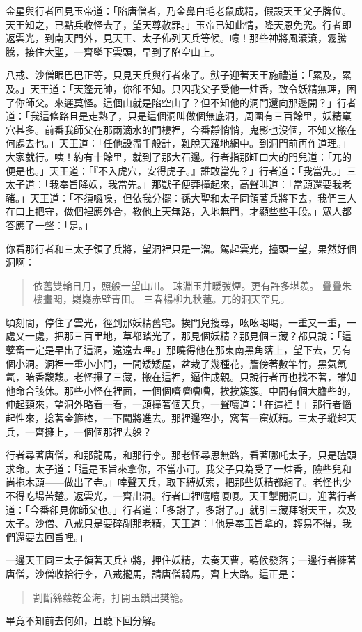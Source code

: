金星與行者回見玉帝道：「陷唐僧者，乃金鼻白毛老鼠成精，假設天王父子牌位。天王知之，已點兵收怪去了，望天尊赦罪。」玉帝已知此情，降天恩免究。行者即返雲光，到南天門外，見天王、太子佈列天兵等候。噫！那些神將風滾滾，霧騰騰，接住大聖，一齊墜下雲頭，早到了陷空山上。

八戒、沙僧眼巴巴正等，只見天兵與行者來了。獃子迎著天王施禮道：「累及，累及。」天王道：「天蓬元帥，你卻不知。只因我父子受他一炷香，致令妖精無理，困了你師父。來遲莫怪。這個山就是陷空山了？但不知他的洞門還向那邊開？」行者道：「我這條路且是走熟了，只是這個洞叫做個無底洞，周圍有三百餘里，妖精窠穴甚多。前番我師父在那兩滴水的門樓裡，今番靜悄悄，鬼影也沒個，不知又搬在何處去也。」天王道：「任他設盡千般計，難脫天羅地網中。到洞門前再作道理。」大家就行。咦！約有十餘里，就到了那大石邊。行者指那缸口大的門兒道：「兀的便是也。」天王道：「『不入虎穴，安得虎子。』誰敢當先？」行者道：「我當先。」三太子道：「我奉旨降妖，我當先。」那獃子便莽撞起來，高聲叫道：「當頭還要我老豬。」天王道：「不須囉噪，但依我分擺：孫大聖和太子同領著兵將下去，我們三人在口上把守，做個裡應外合，教他上天無路，入地無門，才顯些些手段。」眾人都答應了一聲：「是。」

你看那行者和三太子領了兵將，望洞裡只是一溜。駕起雲光，擡頭一望，果然好個洞啊：
\begin{quote}
依舊雙輪日月，照般一望山川。
珠淵玉井暖弢煙。更有許多堪羨。
疊疊朱樓畫閣，嶷嶷赤壁青田。
三春楊柳九秋蓮。兀的洞天罕見。
\end{quote}

頃刻間，停住了雲光，徑到那妖精舊宅。挨門兒搜尋，吆吆喝喝，一重又一重，一處又一處，把那三百里地，草都踏光了，那見個妖精？那見個三藏？都只說：「這孽畜一定是早出了這洞，遠遠去哩。」那曉得他在那東南黑角落上，望下去，另有個小洞。洞裡一重小小門，一間矮矮屋，盆栽了幾種花，簷傍著數竿竹，黑氣氳氳，暗香馥馥。老怪攝了三藏，搬在這裡，逼住成親。只說行者再也找不著，誰知他命合該休。那些小怪在裡面，一個個嚌嚌嘈嘈，挨挨簇簇。中間有個大膽些的，伸起頸來，望洞外略看一看，一頭撞著個天兵，一聲嚷道：「在這裡！」那行者惱起性來，捻著金箍棒，一下闖將進去。那裡邊窄小，窩著一窟妖精。三太子縱起天兵，一齊擁上，一個個那裡去躲？

行者尋著唐僧，和那龍馬，和那行李。那老怪尋思無路，看著哪吒太子，只是磕頭求命。太子道：「這是玉旨來拿你，不當小可。我父子只為受了一炷香，險些兒和尚拖木頭——做出了寺。」啈聲天兵，取下縛妖索，把那些妖精都綑了。老怪也少不得吃場苦楚。返雲光，一齊出洞。行者口裡嘻嘻嗄嗄。天王掣開洞口，迎著行者道：「今番卻見你師父也。」行者道：「多謝了，多謝了。」就引三藏拜謝天王，次及太子。沙僧、八戒只是要碎剮那老精，天王道：「他是奉玉旨拿的，輕易不得，我們還要去回旨哩。」

一邊天王同三太子領著天兵神將，押住妖精，去奏天曹，聽候發落；一邊行者擁著唐僧，沙僧收拾行李，八戒攏馬，請唐僧騎馬，齊上大路。這正是：
\begin{quote}
割斷絲蘿乾金海，打開玉鎖出樊籠。
\end{quote}

畢竟不知前去何如，且聽下回分解。
